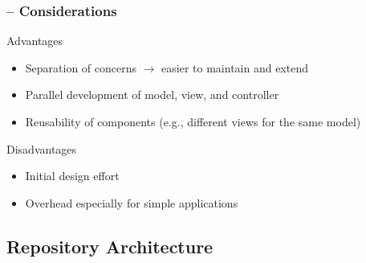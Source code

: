 \begin{frame}
    \frametitle{\insertsubsection{} -- Considerations}
    \begin{fancycolumns}[widths={45,55}]
        \begin{motivation}{Advantages}
            \begin{itemize}
                \item Separation of concerns $\rightarrow$ easier to maintain and extend
                \item Parallel development of model, view, and controller
                \item Reusability of components (e.g., different views for the same model)
            \end{itemize}
        \end{motivation}
        \begin{note}{Disadvantages}
            \begin{itemize}
                \item Initial design effort
                \item Overhead especially for simple applications
            \end{itemize}
        \end{note}

        \nextcolumn
        \mvcdefault{}
    \end{fancycolumns}
\end{frame}



\subsection{Repository Architecture} %

\newcommand{\repositorydefault}{
    \begin{figure}
        \centering
        \begin{tikzpicture}
            \node (repo) at (2,0) [draw, rounded corners, minimum width=7cm, minimum height=1.2cm] {Repository};

            \node (c1) at (0,2) [draw, minimum width=2.4cm, minimum height=1cm] {Component A};
            \node (c2) at (4,2) [draw, minimum width=2.4cm, minimum height=1cm] {Component B};
            \node (c3) at (0,-2) [draw, minimum width=2.4cm, minimum height=1cm] {Component C};
            \node (c4) at (4,-2) [draw, minimum width=2.4cm, minimum height=1cm] {Component D};

            \draw[<->] (c1.south) -- node[right, midway] {Read/Write} (c1 |- repo.north);
            \draw[<->] (c2.south) -- node[right, midway] {Read/Write} (c2 |- repo.north);
            \draw[<->] (c3.north) -- node[right, midway] {Read/Write} (c3 |- repo.south);
            \draw[<->] (c4.north) -- node[right, midway] {Read/Write} (c4 |- repo.south);
        \end{tikzpicture}
    \end{figure}
}

